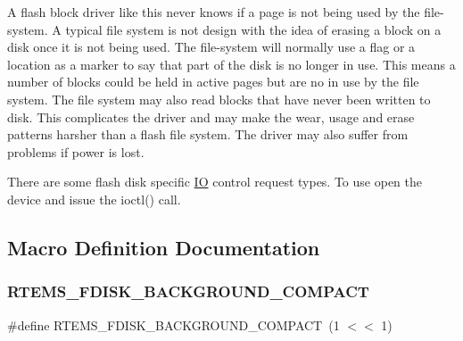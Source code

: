 A flash block driver like this never knows if a page is not being used by the file-\/system. A typical file system is not design with the idea of erasing a block on a disk once it is not being used. The file-\/system will normally use a flag or a location as a marker to say that part of the disk is no longer in use. This means a number of blocks could be held in active pages but are no in use by the file system. The file system may also read blocks that have never been written to disk. This complicates the driver and may make the wear, usage and erase patterns harsher than a flash file system. The driver may also suffer from problems if power is lost.

There are some flash disk specific \mbox{\hyperlink{structIO}{IO}} control request types. To use open the device and issue the ioctl() call.


\begin{DoxyCode}{0}
\DoxyCodeLine{\{}
\DoxyCodeLine{\}}
\DoxyCodeLine{\{}
\DoxyCodeLine{\}}
\end{DoxyCode}
 

\subsection{Macro Definition Documentation}
\mbox{\label{group__RTEMSFDisk_ga6a5bec45cf7f7ada226478f09256bd1c}} 
\subsubsection{\texorpdfstring{RTEMS\_FDISK\_BACKGROUND\_COMPACT}{RTEMS\_FDISK\_BACKGROUND\_COMPACT}}
{\footnotesize\ttfamily \#define R\+T\+E\+M\+S\+\_\+\+F\+D\+I\+S\+K\+\_\+\+B\+A\+C\+K\+G\+R\+O\+U\+N\+D\+\_\+\+C\+O\+M\+P\+A\+CT~(1 $<$$<$ 1)}


